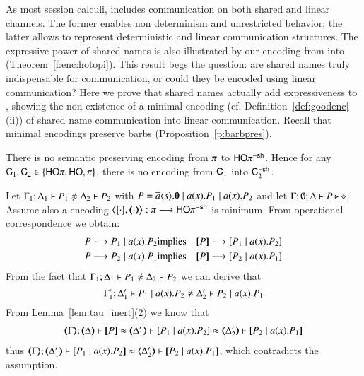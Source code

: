 \noi As most session calculi, 
\HOp includes communication on both shared and linear channels.
The former enables non determinism and unrestricted behavior; the latter allows to represent
deterministic and linear communication structures.
The expressive power of shared names is also illustrated by our 
encoding from \HOp into \sessp (Theorem~\ref{f:enc:hotopi}).
This result begs the question: are shared names truly indispensable for communication, or could they
be encoded using linear communication?
Here we prove that shared names actually add expressiveness to \HOp,
showing 
the non existence of a minimal encoding 
(cf. Definition~\ref{def:goodenc}(ii))
of shared name communication into linear 
communication. 
Recall that minimal encodings preserve barbs (Proposition~\ref{p:barbpres}).

\begin{theorem}\rm
There is no semantic preserving encoding 
from $\pi$ to $\mathsf{HO}\pi^{\mathsf{-sh}}$. Hence 
for any $\mathsf{C}_1,\mathsf{C}_2\in \{ \mathsf{HO}\pi, \mathsf{HO}, \pi\}$, 
there is no encoding from $\mathsf{C}_1$ into $\mathsf{C}_2^{-\mathsf{sh}}$.  
\end{theorem}
\begin{IEEEproof}[Proof]
	Let $\horel{\Gamma_1}{\Delta_1}{P_1}{\not\wb}{\Delta_2}{P_2}$
	with $P = \overline{a} \langle s \rangle . \mathbf{0} \;|\; a (x) . P_1 \;|\; a (x) . P_2$ and	let $\Gamma; \emptyset; \Delta \vdash P \triangleright \diamond$.
	Assume also a encoding
	$\enc{\cdot}{\cdot}: \sessp \longrightarrow \HOp^{\minussh}$
is minimum. 
	From operational correspondence we obtain:
	\begin{eqnarray*}
		P \red P_1 \Par \bacc{a}{x} P_2 &\textrm{implies}& \map{P} \red \map{P_1 \Par \bacc{a}{x} P_2}\\
		P \red P_2 \Par \bacc{a}{x} P_1 &\textrm{implies}& \map{P} \red \map{P_2 \Par \bacc{a}{x} P_1}
	\end{eqnarray*}
	From the fact that
	$\horel{\Gamma_1}{\Delta_1}{P_1}{\not\wb}{\Delta_2}{P_2}$
	we can derive that
%
	\[
		\horel{\Gamma_1'}{\Delta_1'}{P_1 \Par \bacc{a}{x} P_2}{\not\wb}{\Delta_2'}{P_2 \Par \bacc{a}{x} P_1}
	\]
%
	From Lemma~\ref{lem:tau_inert}(2) we know that
%
	\begin{eqnarray*}
		\horel{\mapt{\Gamma}}{\mapt{\Delta}}{\map{P}}{\wb}{\mapt{\Delta_1'}}{\map{P_1 \Par \bacc{a}{x} P_2}}\wb 
{\mapt{\Delta_2'}}\proves {\map{P_2 \Par \bacc{a}{x} P_1}}
	\end{eqnarray*}
%
	\noi thus
$\horel{\mapt{\Gamma}}{\mapt{\Delta_1'}}{\map{P_1 \Par \bacc{a}{x} P_2}}{\wb}{\mapt{\Delta_2'}}{\map{P_2 \Par \bacc{a}{x} P_1}}$, 
%
	which contradicts the assumption. 
\end{IEEEproof}


